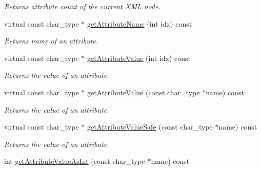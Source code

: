 \begin{DoxyCompactItemize}
\begin{DoxyCompactList}\small\item\em Returns attribute count of the current X\+M\+L node. \end{DoxyCompactList}\item 
\hypertarget{classirr_1_1io_1_1_c_x_m_l_reader_impl_afc1f65d70219634fc005a6048f898fb3}{virtual const char\+\_\+type $\ast$ \hyperlink{classirr_1_1io_1_1_c_x_m_l_reader_impl_afc1f65d70219634fc005a6048f898fb3}{get\+Attribute\+Name} (int idx) const }\label{classirr_1_1io_1_1_c_x_m_l_reader_impl_afc1f65d70219634fc005a6048f898fb3}

\begin{DoxyCompactList}\small\item\em Returns name of an attribute. \end{DoxyCompactList}\item 
\hypertarget{classirr_1_1io_1_1_c_x_m_l_reader_impl_a55bc001ac65fa308a04b65bc1529aa4b}{virtual const char\+\_\+type $\ast$ \hyperlink{classirr_1_1io_1_1_c_x_m_l_reader_impl_a55bc001ac65fa308a04b65bc1529aa4b}{get\+Attribute\+Value} (int idx) const }\label{classirr_1_1io_1_1_c_x_m_l_reader_impl_a55bc001ac65fa308a04b65bc1529aa4b}

\begin{DoxyCompactList}\small\item\em Returns the value of an attribute. \end{DoxyCompactList}\item 
\hypertarget{classirr_1_1io_1_1_c_x_m_l_reader_impl_a7252bf5d02f9cc05ade31e658502116a}{virtual const char\+\_\+type $\ast$ \hyperlink{classirr_1_1io_1_1_c_x_m_l_reader_impl_a7252bf5d02f9cc05ade31e658502116a}{get\+Attribute\+Value} (const char\+\_\+type $\ast$name) const }\label{classirr_1_1io_1_1_c_x_m_l_reader_impl_a7252bf5d02f9cc05ade31e658502116a}

\begin{DoxyCompactList}\small\item\em Returns the value of an attribute. \end{DoxyCompactList}\item 
\hypertarget{classirr_1_1io_1_1_c_x_m_l_reader_impl_af8ff476656b98b9f491b453c8093b77b}{virtual const char\+\_\+type $\ast$ \hyperlink{classirr_1_1io_1_1_c_x_m_l_reader_impl_af8ff476656b98b9f491b453c8093b77b}{get\+Attribute\+Value\+Safe} (const char\+\_\+type $\ast$name) const }\label{classirr_1_1io_1_1_c_x_m_l_reader_impl_af8ff476656b98b9f491b453c8093b77b}

\begin{DoxyCompactList}\small\item\em Returns the value of an attribute. \end{DoxyCompactList}\item 
\hypertarget{classirr_1_1io_1_1_c_x_m_l_reader_impl_a5d532267e6e4ac8fcb402671842c32c9}{int \hyperlink{classirr_1_1io_1_1_c_x_m_l_reader_impl_a5d532267e6e4ac8fcb402671842c32c9}{get\+Attribute\+Value\+As\+Int} (const char\+\_\+type $\ast$name) const }\label{classirr_1_1io_1_1_c_x_m_l_reader_impl_a5d532267e6e4ac8fcb402671842c32c9}


\end{DoxyCompactItemize}

